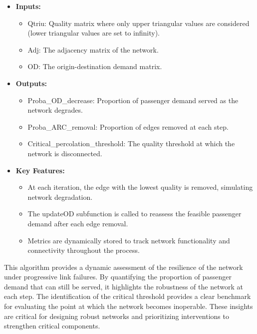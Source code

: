 \documentclass[
  letterpaper,
  DIV=11,
  numbers=noendperiod]{scrartcl}
\providecommand{\tightlist}{%
  \setlength{\itemsep}{0pt}\setlength{\parskip}{0pt}}\usepackage{longtable,booktabs,array}
\begin{document}
\begin{itemize}
\tightlist
\item
  \textbf{Inputs:}

  \begin{itemize}
  \tightlist
  \item
    Qtriu: Quality matrix where only upper triangular values are
    considered (lower triangular values are set to infinity).
  \item
    Adj: The adjacency matrix of the network.
  \item
    OD: The origin-destination demand matrix.
  \end{itemize}
\item
  \textbf{Outputs:}

  \begin{itemize}
  \tightlist
  \item
    Proba\_OD\_decrease: Proportion of passenger demand served as the
    network degrades.
  \item
    Proba\_ARC\_removal: Proportion of edges removed at each step.
  \item
    Critical\_percolation\_threshold: The quality threshold at which the
    network is disconnected.
  \end{itemize}
\item
  \textbf{Key Features:}

  \begin{itemize}
  \tightlist
  \item
    At each iteration, the edge with the lowest quality is removed,
    simulating network degradation.
  \item
    The updateOD subfunction is called to reassess the feasible
    passenger demand after each edge removal.
  \item
    Metrics are dynamically stored to track network functionality and
    connectivity throughout the process.
  \end{itemize}
\end{itemize}

This algorithm provides a dynamic assessment of the resilience of the
network under progressive link failures. By quantifying the proportion
of passenger demand that can still be served, it highlights the
robustness of the network at each step. The identification of the
critical threshold provides a clear benchmark for evaluating the point
at which the network becomes inoperable. These insights are critical for
designing robust networks and prioritizing interventions to strengthen
critical components.
\end{document}
